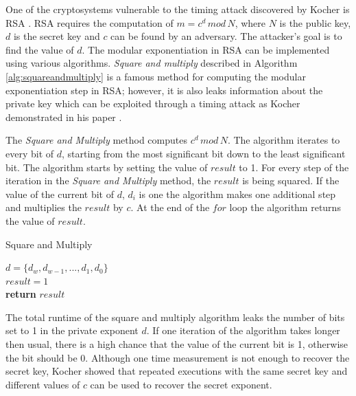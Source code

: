 \documentclass[10pt,a4paper,twoside]{book}
\begin{document}

One of the cryptosystems vulnerable to the timing attack discovered by Kocher is RSA \cite{rivest1978method}. RSA requires the computation of $m = c^d \, mod \, N$, where $N$ is the public key, $d$ is the secret key and $c$ can be found by an adversary. The attacker's goal is to find the value of $d$. The modular exponentiation in RSA can be implemented using various algorithms. \textit{Square and multiply} described in Algorithm \ref{alg:squareandmultiply} is a famous method for computing the modular exponentiation step in RSA; however, it is also leaks information about the private key which can be exploited through a timing attack as Kocher demonstrated in his paper \cite{kocher1996timing}.

The \textit{Square and Multiply} method computes $c^d \, mod \, N$. The algorithm iterates to every bit of $d$, starting from the most significant bit down to the least significant bit. The algorithm starts by setting the value of $result$ to 1. For every step of the iteration in the \textit{Square and Multiply} method, the $result$ is being squared. If the value of the current bit of $d$, $d_i$ is one the algorithm makes one additional step and multiplies the $result$ by $c$. At the end of the $for$ loop the algorithm returns the value of $result$. 

\begin{algorithm}
\caption{Square and Multiply}
\label{alg:squareandmultiply}
$d = \{d_w, d_{w-1}, ..., d_1, d_0\}$\\
$result = 1$\\
{\bf return} $result$
\end{algorithm}

The total runtime of the square and multiply algorithm leaks the number of bits set to 1 in the private exponent $d$. If one iteration of the algorithm takes longer then usual, there is a high chance that the value of the current bit is 1, otherwise the bit should be 0. Although one time measurement is not enough to recover the secret key, Kocher\cite{kocc2009cryptographic} showed that repeated executions with the same secret key and different values of $c$ can be used to recover the secret exponent.
\end{document}
